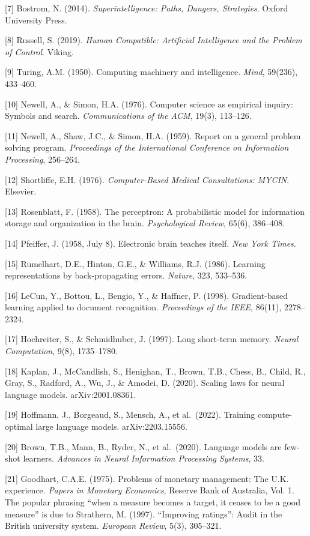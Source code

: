 \documentclass[
  11pt,
  letterpaper,
]{article}
\begin{document}
{[}7{]} Bostrom, N. (2014). \emph{Superintelligence: Paths, Dangers,
Strategies}. Oxford University Press.

{[}8{]} Russell, S. (2019). \emph{Human Compatible: Artificial
Intelligence and the Problem of Control}. Viking.

{[}9{]} Turing, A.M. (1950). Computing machinery and intelligence.
\emph{Mind}, 59(236), 433--460.

{[}10{]} Newell, A., \& Simon, H.A. (1976). Computer science as
empirical inquiry: Symbols and search. \emph{Communications of the ACM},
19(3), 113--126.

{[}11{]} Newell, A., Shaw, J.C., \& Simon, H.A. (1959). Report on a
general problem solving program. \emph{Proceedings of the International
Conference on Information Processing}, 256--264.

{[}12{]} Shortliffe, E.H. (1976). \emph{Computer-Based Medical
Consultations: MYCIN}. Elsevier.

{[}13{]} Rosenblatt, F. (1958). The perceptron: A probabilistic model
for information storage and organization in the brain.
\emph{Psychological Review}, 65(6), 386--408.

{[}14{]} Pfeiffer, J. (1958, July 8). Electronic brain teaches itself.
\emph{New York Times}.

{[}15{]} Rumelhart, D.E., Hinton, G.E., \& Williams, R.J. (1986).
Learning representations by back-propagating errors. \emph{Nature}, 323,
533--536.

{[}16{]} LeCun, Y., Bottou, L., Bengio, Y., \& Haffner, P. (1998).
Gradient-based learning applied to document recognition.
\emph{Proceedings of the IEEE}, 86(11), 2278--2324.

{[}17{]} Hochreiter, S., \& Schmidhuber, J. (1997). Long short-term
memory. \emph{Neural Computation}, 9(8), 1735--1780.

{[}18{]} Kaplan, J., McCandlish, S., Henighan, T., Brown, T.B., Chess,
B., Child, R., Gray, S., Radford, A., Wu, J., \& Amodei, D. (2020).
Scaling laws for neural language models. arXiv:2001.08361.

{[}19{]} Hoffmann, J., Borgeaud, S., Mensch, A., et al.~(2022). Training
compute-optimal large language models. arXiv:2203.15556.

{[}20{]} Brown, T.B., Mann, B., Ryder, N., et al.~(2020). Language
models are few-shot learners. \emph{Advances in Neural Information
Processing Systems}, 33.

{[}21{]} Goodhart, C.A.E. (1975). Problems of monetary management: The
U.K. experience. \emph{Papers in Monetary Economics}, Reserve Bank of
Australia, Vol. 1. The popular phrasing ``when a measure becomes a
target, it ceases to be a good measure'' is due to Strathern, M. (1997).
``Improving ratings'': Audit in the British university system.
\emph{European Review}, 5(3), 305--321.
\end{document}
